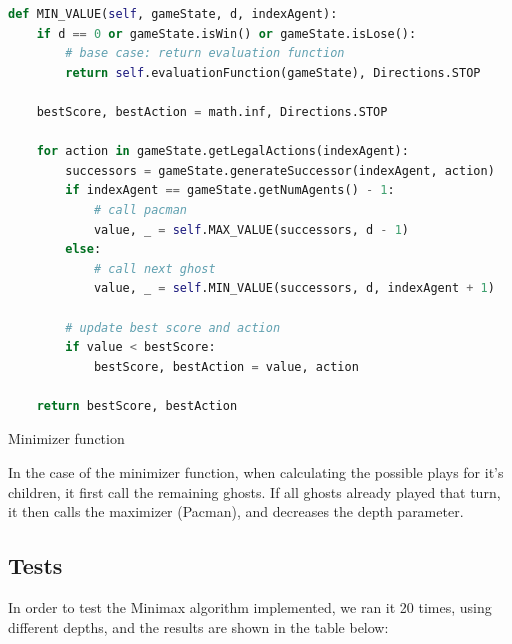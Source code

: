\documentclass{article}
\begin{document}
\begin{table}[!ht]
\begin{lstlisting}[language=python, frame=tlbr, framesep=6pt, backgroundcolor=\color{light-gray}]
def MIN_VALUE(self, gameState, d, indexAgent):
    if d == 0 or gameState.isWin() or gameState.isLose():
        # base case: return evaluation function
        return self.evaluationFunction(gameState), Directions.STOP

    bestScore, bestAction = math.inf, Directions.STOP

    for action in gameState.getLegalActions(indexAgent):
        successors = gameState.generateSuccessor(indexAgent, action)
        if indexAgent == gameState.getNumAgents() - 1:
            # call pacman
            value, _ = self.MAX_VALUE(successors, d - 1)
        else:
            # call next ghost
            value, _ = self.MIN_VALUE(successors, d, indexAgent + 1)

        # update best score and action
        if value < bestScore:
            bestScore, bestAction = value, action

    return bestScore, bestAction
\end{lstlisting}
\caption{Minimizer function}
\label{tab:minimax-minimizer}
\end{table}

In the case of the minimizer function, when calculating the possible plays for it's children, it first call the remaining ghosts. If all ghosts already played that turn, it then calls the maximizer (Pacman), and decreases the depth parameter.

\subsection{Tests}

In order to test the Minimax algorithm implemented, we ran it 20 times, using different depths, and the results are shown in the table below: \\
\end{document}
